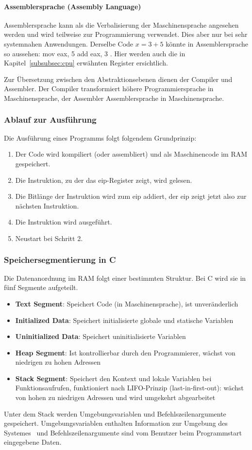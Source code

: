 \documentclass[11pt, a4paper]{article}
\begin{document}
\paragraph{Assemblersprache (Assembly Language)}
Assemblersprache kann als die Verbalisierung der Maschinensprache angesehen werden und wird teilweise zur Programmierung verwendet. Dies aber nur bei sehr systemnahen Anwendungen. Derselbe Code \(x = 3 + 5\) könnte in Assemblersprache so aussehen: 
mov eax, 5
add eax, 3
. Hier werden auch die in Kapitel~\ref{subsubsec:cpu} erwähnten Register ersichtlich.

Zur Übersetzung zwischen den Abstraktionsebenen dienen der Compiler und Assembler. Der Compiler transformiert höhere Programmiersprache in Maschinensprache, der Assembler Assemblersprache in Maschinensprache.

\subsubsection{Ablauf zur Ausführung}
Die Ausführung eines Programms folgt folgendem Grundprinzip:
\begin{enumerate}
	\item Der Code wird kompiliert (oder assembliert) und als Maschinencode im RAM gespeichert.
	\item Die Instruktion, zu der das \gls{eip}-Register zeigt, wird gelesen.
	\item Die Bitlänge der Instruktion wird zum \gls{eip} addiert, der \gls{eip} zeigt jetzt also zur nächsten Instruktion.
	\item Die Instruktion wird ausgeführt.
	\item Neustart bei Schritt 2.
\end{enumerate}

\subsubsection{Speichersegmentierung in C}
Die Datenanordnung im RAM folgt einer bestimmten Struktur. Bei C wird sie in fünf Segmente aufgeteilt.
\begin{itemize}
	\item \textbf{Text Segment}: Speichert Code (in Maschinensprache), ist unveränderlich
	\item \textbf{Initialized Data}: Speichert initialisierte globale und statische Variablen
	\item \textbf{Uninitialized Data}: Speichert uninitialisierte Variablen
	\item \textbf{Heap Segment}: Ist kontrollierbar durch den Programmierer, wächst von niedrigen zu hohen Adressen~\cite{StackHeapYoutube:online}
	\item \textbf{Stack Segment}: Speichert den Kontext und lokale Variablen bei Funktionsaufrufen, funktioniert nach LIFO-Prinzip (last-in-first-out): wächst von hohen zu niedrigen Adressen und wird umgekehrt abgearbeitet~\cite{StackHeapYoutube:online}
\end{itemize}
Unter dem Stack werden Umgebungsvariablen und Befehlszeilenargumente gespeichert. Umgebungsvariablen enthalten Information zur Umgebung des Systemes~\cite{UmgebungsMicrosoft:online} und Befehlszeilenargumente sind vom Benutzer beim Programmstart eingegebene Daten.
\end{document}
